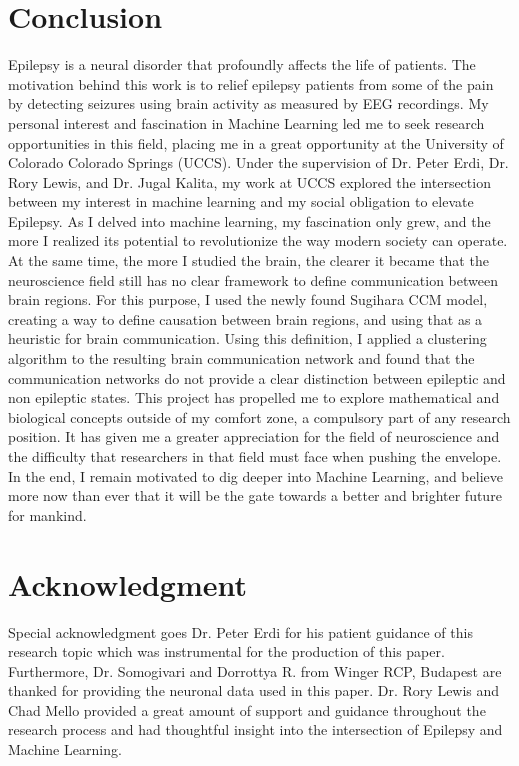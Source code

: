 \documentclass[journal,12pt,onecolumn,draftclsnofoot]{IEEEtran}  %
\begin{document}
\section{Conclusion}
Epilepsy is a neural disorder that profoundly affects the life of patients. The motivation behind this work is to relief epilepsy patients from some of the pain by detecting seizures using brain activity as measured by EEG recordings. My personal interest and fascination in Machine Learning led me to seek research opportunities in this field, placing me in a great opportunity at the University of Colorado Colorado Springs (UCCS). Under the supervision of Dr. Peter Erdi, Dr. Rory Lewis, and Dr. Jugal Kalita, my work at UCCS explored the intersection between my interest in machine learning and my social obligation to elevate Epilepsy. As I delved into machine learning, my fascination only grew, and the more I realized its potential to revolutionize the way modern society can operate. At the same time, the more I studied the brain, the clearer it became that the neuroscience field still has no clear framework to define communication between brain regions. For this purpose, I used the newly found Sugihara CCM model, creating a way to define causation between brain regions, and using that as a heuristic for brain communication. Using this definition, I applied a clustering algorithm to the resulting brain communication network and found that the communication networks do not provide a clear distinction between epileptic and non epileptic states. This project has propelled me to explore mathematical and biological concepts outside of my comfort zone, a compulsory part of any research position. It has given me a greater appreciation for the field of neuroscience and the difficulty that researchers in that field must face when pushing the envelope. In the end, I remain motivated to dig deeper into Machine Learning, and believe more now than ever that it will be the gate towards a better and brighter future for mankind.

\section*{Acknowledgment}

Special acknowledgment goes Dr. Peter Erdi for his patient guidance of this research topic which was instrumental for the production of this paper. Furthermore, Dr. Somogivari and Dorrottya R. from Winger RCP, Budapest are thanked for providing the neuronal data used in this paper. Dr. Rory Lewis and Chad Mello provided a great amount of support and guidance throughout the research process and had thoughtful insight into the intersection of Epilepsy and Machine Learning.

\pagebreak

\balance


\end{document}

